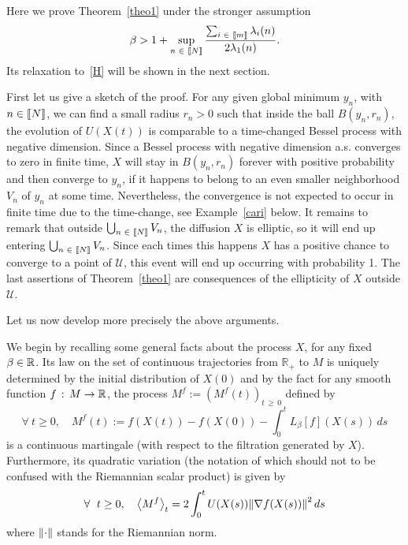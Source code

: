 \documentclass[10pt]{amsart}
\theoremstyle{definition}\newtheorem{defi}[theo]{Definition}\newtheorem{rema}[theo]{Remark}\newtheorem{exam}[theo]{Example}\newtheorem{exem}[theo]{Example}\newtheorem{nota}[theo]{Notation}
\newcommand{\f}[2]{\frac{#1}{#2}}
\newcommand{\cU}{\mathcal{U}}
\newcommand{\RR}{\mathbb{R}}
\newcommand{\na}{\nabla}
\newcommand{\fo}{\forall\ }
\let\originalleft\left
\let\originalright\right
\renewcommand{\left}{\mathopen{}\mathclose\bgroup\originalleft}
\renewcommand{\right}{\aftergroup\egroup\originalright}
\let\oldin\in
\renewcommand{\in}{\mathchoice{\oldin}{\oldin}{\,\oldin\,}{\,\oldin\,}}
\renewcommand*{\to}{\mathchoice{\longrightarrow}{\rightarrow}{\rightarrow}{\rightarrow}}
\let\oldforall\forall
\renewcommand*{\forall}{\mathrel{\oldforall}}
\newcommand{\llbracket}{\mathopen{[\mkern -2.7mu[}}
\newcommand{\rrbracket}{\mathclose{]\mkern -2.7mu]}}
\newcommand{\lin}{\llbracket}
\newcommand{\rin}{\rrbracket}
\begin{document}
Here we prove Theorem~\ref{theo1} under the stronger assumption
\begin{equation}\label{H3}
\beta >1+\sup_{n\in\lin N\rin}\f{\sum_{i\in\lin m\rin}\lambda_i(n)}{2\lambda_1(n)}.
\end{equation}
Its relaxation to~\eqref{H} will be shown in the next section.

 First let us give a sketch of the proof. For any given global minimum $y_n$, with $n\in\lin N\rin$, we can find a small radius $r_n>0$ such that inside the ball $B(y_n,r_n)$, the evolution of $U(X(t))$ is comparable to a time-changed Bessel process with negative dimension. Since a Bessel process with negative dimension a.s. converges to zero in finite time, $X$ will stay in $B(y_n,r_n)$ forever with positive probability and then converge to $y_n$, if it happens to belong to an even smaller neighborhood $V_n$ of $y_n$ at some time. Nevertheless, the convergence is not expected to occur in finite time due to the time-change, see Example~\ref{cari} below. It remains to remark that outside $\bigcup_{n\in\lin N\rin} V_n$, the diffusion $X$ is elliptic, so it will end up entering $\bigcup_{n\in\lin N\rin} V_n$. Since each times this happens $X$ has a positive chance to converge to a point of $\cU$, this event will end up occurring with probability 1. The last assertions of Theorem~\ref{theo1} are consequences of the ellipticity of $X$ outside $\cU$.


Let us now develop more precisely the above arguments.

We begin by recalling some general facts about the process $X$, for any fixed $\beta\in\RR$. Its law on the set of continuous trajectories from $\RR_+$ to $M$ is uniquely determined by the initial distribution of $X(0)$ and by the fact for any smooth function $f\,:\, M\to \RR$, the process $M^f:= (M^f(t))_{t\,\geq\,0}$ defined by
\begin{equation*}
\fo t\geq 0,\quad M^f(t) := f(X(t))-f(X(0))-\int_0^tL_\beta[f](X(s))\, ds
\end{equation*} 
is a continuous martingale (with respect to the filtration generated by $X$). Furthermore, its quadratic variation (the notation of which should not to be confused with the Riemannian scalar product) is given by
\begin{equation}\label{lanMranf}
\fo t\geq 0,\quad \left\langle M^f\right\rangle_t = 2\int_0^t U(X(s))\left\| \na f(X(s))\right\|^2\, ds
\end{equation}
where $\left\| \cdot\right\|$ stands for the Riemannian norm.
\end{document}
